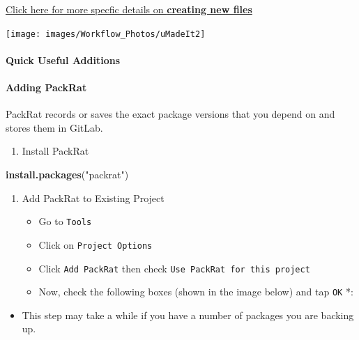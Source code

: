 \documentclass[openany]{article}
\newenvironment{Shaded}{\begin{snugshade}}{\end{snugshade}}
\newcommand{\KeywordTok}[1]{\textcolor[rgb]{0.13,0.29,0.53}{\textbf{#1}}}
\newcommand{\NormalTok}[1]{#1}
\newcommand{\StringTok}[1]{\textcolor[rgb]{0.31,0.60,0.02}{#1}}
\providecommand{\tightlist}{%
  \setlength{\itemsep}{0pt}\setlength{\parskip}{0pt}}
\let\oldparagraph\paragraph
\renewcommand{\paragraph}[1]{\oldparagraph{#1}\mbox{}}
\begin{document}
\protect\hyperlink{adding-new-files}{Click here for more specfic details on \textbf{creating new files}}

\begin{center}\texttt{[image: images/Workflow\_Photos/uMadeIt2]} \end{center}

\hypertarget{quick-useful-additions}{%
\paragraph{Quick Useful Additions}\label{quick-useful-additions}}

\hypertarget{adding-packrat}{%
\paragraph{Adding PackRat}\label{adding-packrat}}

PackRat records or saves the exact package versions that you depend on and stores them in GitLab.

\begin{enumerate}
\def\labelenumi{\arabic{enumi}.}
\tightlist
\item
  Install PackRat
\end{enumerate}

\begin{Shaded}
\begin{Highlighting}[]
\KeywordTok{install.packages}\NormalTok{(}\StringTok{"packrat"}\NormalTok{)}
\end{Highlighting}
\end{Shaded}

\begin{enumerate}
\def\labelenumi{\arabic{enumi}.}
\setcounter{enumi}{1}
\item
  Add PackRat to Existing Project

  \begin{itemize}
  \tightlist
  \item
    Go to \texttt{Tools}
  \item
    Click on \texttt{Project\ Options}
  \item
    Click \texttt{Add\ PackRat} then check \texttt{Use\ PackRat\ for\ this\ project}
  \item
    Now, check the following boxes (shown in the image below) and tap \texttt{OK} *:
  \end{itemize}
\end{enumerate}

\begin{itemize}
\tightlist
\item
  This step may take a while if you have a number of packages you are backing up.
\end{itemize}
\end{document}
